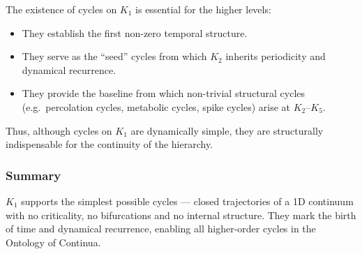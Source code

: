 The existence of cycles on $K_1$ is essential for the higher levels:

\begin{itemize}
  \item They establish the first non-zero temporal structure.
  \item They serve as the ``seed'' cycles from which $K_2$
        inherits periodicity and dynamical recurrence.
  \item They provide the baseline from which non-trivial structural
        cycles (e.g.\ percolation cycles, metabolic cycles, spike
        cycles) arise at $K_2$–$K_5$.
\end{itemize}

Thus, although cycles on $K_1$ are dynamically simple, they are
structurally indispensable for the continuity of the hierarchy.

\subsubsection{Summary}

$K_1$ supports the simplest possible cycles — closed trajectories of a
1D continuum with no criticality, no bifurcations and no internal
structure.  
They mark the birth of time and dynamical recurrence, enabling all
higher-order cycles in the Ontology of Continua.
